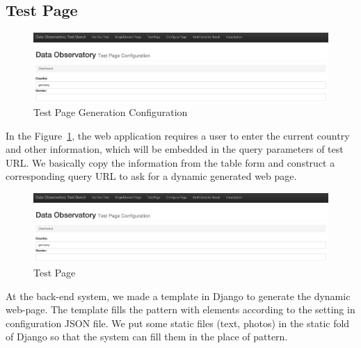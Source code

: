 \documentclass[fleqn,12pt]{SelfArx} %
\begin{document}
\subsection{Test Page}
\begin{figure}[h!]
	\includegraphics[width=\linewidth]{testpage1.jpg}
    \caption{Test Page Generation Configuration}
    \label{fig:testpage1}
\end{figure}
In the Figure~\ref{fig:testpage1}, the web application requires a user to enter the current country and other information, which will be embedded in the query parameters of test URL. We basically copy the information from the table form and construct a corresponding query URL to ask for a dynamic generated web page.\par
\begin{figure}[h!]
	\includegraphics[width=\linewidth]{testpage1.jpg}
    \caption{Test Page}
    \label{fig:testpage2}
\end{figure}
At the back-end system, we made a template in Django to generate the dynamic web-page. The template fills the pattern with elements according to the setting in configuration JSON file. We put some static files (text, photos) in the static fold of Django so that the system can fill them in the place of pattern.
\end{document}
